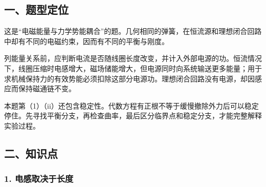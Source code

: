\documentclass[12pt,a4paper,fontset=fandol]{ctexart}
\begin{document}
\begin{center}
\begin{minipage}{\linewidth}
\centering\begingroup{}
\ifdim\wd\diagrambox>.88\linewidth
\sbox{\diagrambox}{\resizebox{.88\linewidth}{!}{\usebox{\diagrambox}}}\fi
\ifdim\ht\diagrambox>.38\textheight
\resizebox{!}{.38\textheight}{\usebox{\diagrambox}}
\else\usebox{\diagrambox}\fi
\par{}\endgroup\end{minipage}\end{center}

\subsection{一、题型定位}\label{ux4e00ux9898ux578bux5b9aux4f4d-1}

这是``电磁能量与力学势能耦合''的题。几何相同的弹簧，在恒流源和理想闭合回路中却有不同的电磁约束，因而有不同的平衡与刚度。

列能量关系前，应判断电流是否随线圈长度改变，并计入外部电源的功。恒流情况下，线圈压缩时电感增大，磁场储能增大，但电源同时向系统输送更多能量；用于求机械保持力的有效势能必须扣除这部分电源功。理想闭合回路没有电源，却因感应而保持磁通链不变。

本题第（1）（ii）还包含稳定性。代数方程有正根不等于缓慢撤除外力后可以稳定停住。先寻找平衡分支，再检查曲率，最后区分临界点和稳定分支，才能完整解释实验过程。

\subsection{二、知识点}\label{ux4e8cux77e5ux8bc6ux70b9-1}

\subsubsection{1.
电感取决于长度}\label{ux7535ux611fux53d6ux51b3ux4e8eux957fux5ea6}
\end{document}
